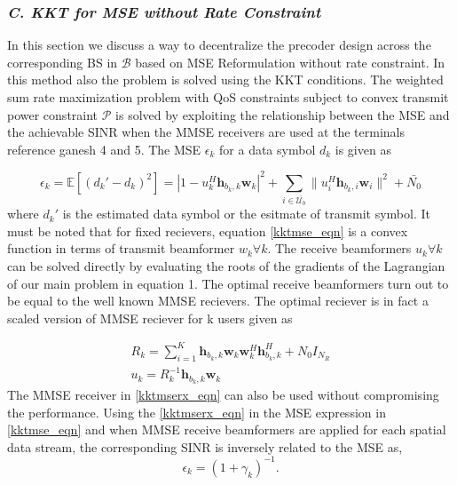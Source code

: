 \documentclass[a4paper, 12pt,titlepage]{dithesis} %
\newcommand{\me}[1]{\( #1 \)}
\begin{document}
\subsubsection*{\textit{C. KKT for MSE without Rate Constraint}}

In this section we discuss a way to decentralize the precoder design across the corresponding \ac{BS} in \me{\mathcal{B}} based on MSE Reformulation without rate constraint. In this method also the problem is solved using the \ac{KKT} conditions. The weighted sum rate maximization problem with \ac{QoS} constraints subject to convex transmit power constraint \me{\mathcal{P}} is solved by exploiting the relationship between the \ac{MSE} and the achievable \ac{SINR} when the \ac{MMSE} receivers are used at the terminals reference ganesh 4 and 5. The \ac{MSE} \me{\epsilon_k} for a data symbol \me{d_k} is given as

\begin{equation}
\epsilon_k = \mathbb{E} \left[ (d_k' - d_k)^2\right] = |1 - u_k^H \mathbf{h}_{{b_k},k} \mathbf{w}_k|^2 + \sum_{i \in \bar{\mathcal{U}_b}} \|u_i^H \mathbf{h}_{{b_k},i} \mathbf{w}_i\|^2 + \bar{N_0}
\label{kktmse_eqn}
\end{equation}
where \me{d_k'} is the estimated data symbol or the esitmate of transmit symbol. It must be noted that for fixed recievers, equation \eqref{kktmse_eqn} is a convex function in terms of transmit beamformer \me{w_k \forall k}. The receive beamformers \me{u_k \forall k} can be solved directly by evaluating the roots of the gradients of the Lagrangian of our main problem in equation 1. The optimal receive beamformers turn out to be equal to the well known \ac{MMSE} recievers. The optimal reciever is in fact a scaled version of \ac{MMSE} reciever for k users given as

\begin{eqnarray}
R_k = \sum_{i=1}^K \mathbf{h}_{{b_k},k} \mathbf{w}_k \mathbf{w}_k^H \mathbf{h}_{{b_k},k}^H + N_0 I_{N_R}  \nonumber \\
u_k = R_k^{-1} \mathbf{h}_{{b_k},k} \mathbf{w}_k 
\label{kktmserx_eqn}
\end{eqnarray}
The \ac{MMSE} receiver in \eqref{kktmserx_eqn} can also be used without compromising the performance. Using the \eqref{kktmserx_eqn} in the \ac{MSE} expression in \eqref{kktmse_eqn} and when \ac{MMSE} receive beamformers are applied for each spatial data stream, the corresponding \ac{SINR} is inversely related to the \ac{MSE} as,
\begin{equation}
\epsilon_k = \left(1 + \gamma_k\right)^{-1}.
\end{equation}
\end{document}
